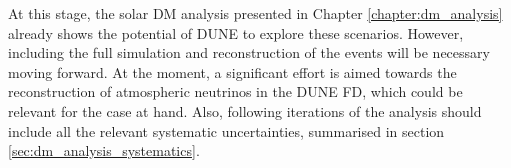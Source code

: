 \begin{comment}
The solar DM analysis is covered in Chapter \ref{chapter:dm_analysis}. There I explain how the DUNE FD can be used to probe DM interactions by measuring the neutrino flux coming from DM annihilations in the core of the Sun. After introducing the topic of DM capture and annihilation in a massive object like the Sun, I describe what kind of neutrino signals one can expect from such events in section \ref{sec:dm_analysis_flux}. Later, I comment on how DUNE could constrain the DM parameter space by performing counting experiments. In section \ref{sec:dm_analysis_high_e_nu} I study the selection efficiency for the $\tau^{+}\tau^{-}$ and $b\bar{b}$ channels. I focus on two different kinematic regimes: the high energy neutrinos where DIS interactions with argon dominate, and the low energy part of the spectrum where neutrinos mainly undergo QEL interactions. This allows me to compute the projected generator-level DM cross section sensitivities, showing how DUNE can be complementary to other indirect DM searches. Additionally, I explore two specific realisations of the DM interactions, namely Kaluza-Klein and leptophilic DM.

At this stage, this analysis already shows the potential of DUNE to explore these scenarios. However, including the full simulation and reconstruction of the events will be necessary moving forward. At the moment, a significant effort is aimed towards the reconstruction of atmospheric neutrinos in the DUNE FD, which could be relevant for the case at hand. Also, following iterations of the analysis should include all the relevant systematic uncertainties. A summary of these is presented in section \ref{sec:dm_analysis_systematics}.
\end{comment}

At this stage, the solar DM analysis presented in Chapter \ref{chapter:dm_analysis} already shows the potential of DUNE to explore these scenarios. However, including the full simulation and reconstruction of the events will be necessary moving forward. At the moment, a significant effort is aimed towards the reconstruction of atmospheric neutrinos in the DUNE FD, which could be relevant for the case at hand. Also, following iterations of the analysis should include all the relevant systematic uncertainties, summarised in section \ref{sec:dm_analysis_systematics}.


